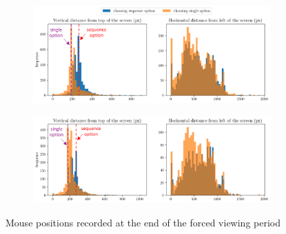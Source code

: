 \begin{figure}
  \centering
  \begin{subfigure}{\textwidth}
    \centering
    \includegraphics[width=\linewidth]{figures/exp3_mouse_intertemporal.png}
  \end{subfigure}
  \begin{subfigure}{\textwidth}
    \vspace{1.5em}
    \centering
    \includegraphics[width=\linewidth]{figures/exp3_mouse_rabbit.png}
  \end{subfigure}
  \caption{Mouse positions recorded at the end of the forced viewing period}
  \label{fig:exp3_mouse_position}
\end{figure}

